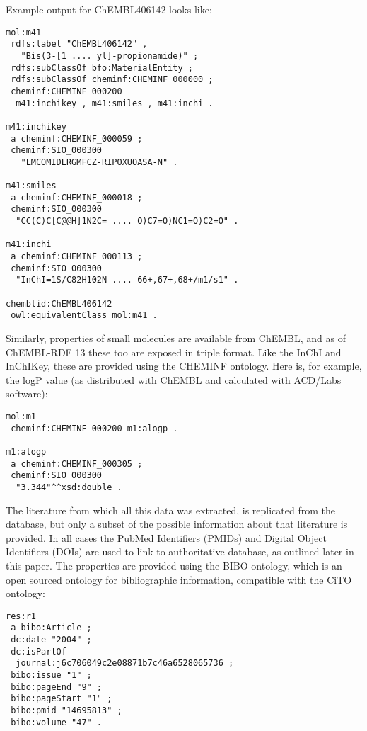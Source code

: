 \documentclass[10pt]{bmc_article}
\newenvironment{bmcformat}{\begin{raggedright}\baselineskip20pt\sloppy\setboolean{publ}{false}}{\end{raggedright}\baselineskip20pt\sloppy}
\begin{document}
\begin{bmcformat}
Example output for ChEMBL406142 looks like:

\begin{small}
\begin{verbatim}
mol:m41
 rdfs:label "ChEMBL406142" , 
   "Bis(3-[1 .... yl]-propionamide)" ;
 rdfs:subClassOf bfo:MaterialEntity ;
 rdfs:subClassOf cheminf:CHEMINF_000000 ;
 cheminf:CHEMINF_000200
  m41:inchikey , m41:smiles , m41:inchi .

m41:inchikey
 a cheminf:CHEMINF_000059 ;
 cheminf:SIO_000300
   "LMCOMIDLRGMFCZ-RIPOXUOASA-N" .

m41:smiles
 a cheminf:CHEMINF_000018 ;
 cheminf:SIO_000300
  "CC(C)C[C@@H]1N2C= .... O)C7=O)NC1=O)C2=O" .

m41:inchi
 a cheminf:CHEMINF_000113 ;
 cheminf:SIO_000300
  "InChI=1S/C82H102N .... 66+,67+,68+/m1/s1" .

chemblid:ChEMBL406142
 owl:equivalentClass mol:m41 .
\end{verbatim}
\end{small}

Similarly, properties of small molecules are available from ChEMBL, and as of ChEMBL-RDF 13
these too are exposed in triple format. Like the InChI and InChIKey, these are provided using the
CHEMINF ontology. Here is, for example, the logP value (as distributed with ChEMBL and
calculated with ACD/Labs software):

\begin{small}
\begin{verbatim}
mol:m1
 cheminf:CHEMINF_000200 m1:alogp .

m1:alogp
 a cheminf:CHEMINF_000305 ;
 cheminf:SIO_000300
  "3.344"^^xsd:double .
\end{verbatim}
\end{small}

The literature from which all this data was extracted, is replicated from the database,
but only a subset of the possible information about that literature is provided. In all cases 
the PubMed Identifiers (PMIDs) and Digital Object Identifiers (DOIs) are used to link
to authoritative database, as outlined later in this paper.
The properties are provided using the BIBO ontology, which is an open sourced ontology
for bibliographic information, compatible with the CiTO ontology:

\begin{small}
\begin{verbatim}
res:r1
 a bibo:Article ;
 dc:date "2004" ;
 dc:isPartOf
  journal:j6c706049c2e08871b7c46a6528065736 ;
 bibo:issue "1" ;
 bibo:pageEnd "9" ;
 bibo:pageStart "1" ;
 bibo:pmid "14695813" ;
 bibo:volume "47" .


\end{verbatim}
\end{small}
\end{bmcformat}
\end{document}
